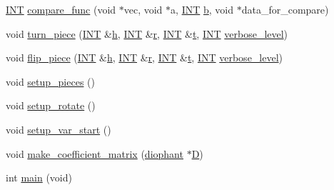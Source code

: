 \begin{DoxyCompactItemize}
\item 
\mbox{\hyperlink{galois_8h_a09fddde158a3a20bd2dcadb609de11dc}{I\+NT}} \mbox{\hyperlink{pentomino__5x5_8_c_af532ec92afffcb63cd1f1180e96642d4}{compare\+\_\+func}} (void $\ast$vec, void $\ast$a, \mbox{\hyperlink{galois_8h_a09fddde158a3a20bd2dcadb609de11dc}{I\+NT}} \mbox{\hyperlink{alphabet2_8_c_a148e3876077787926724625411d6e7a9}{b}}, void $\ast$data\+\_\+for\+\_\+compare)
\item 
void \mbox{\hyperlink{pentomino__5x5_8_c_afeaa9ad5370af3cec823a11a292bbf52}{turn\+\_\+piece}} (\mbox{\hyperlink{galois_8h_a09fddde158a3a20bd2dcadb609de11dc}{I\+NT}} \&\mbox{\hyperlink{alphabet2_8_c_a16611451551e3d15916bae723c3f59f7}{h}}, \mbox{\hyperlink{galois_8h_a09fddde158a3a20bd2dcadb609de11dc}{I\+NT}} \&\mbox{\hyperlink{alphabet2_8_c_acab531abaa74a7e664e3986f2522b33a}{r}}, \mbox{\hyperlink{galois_8h_a09fddde158a3a20bd2dcadb609de11dc}{I\+NT}} \&\mbox{\hyperlink{alphabet2_8_c_ac310d9181e916ba43604099aee272c71}{t}}, \mbox{\hyperlink{galois_8h_a09fddde158a3a20bd2dcadb609de11dc}{I\+NT}} \mbox{\hyperlink{simeon_8_c_a818073fbcc2f439e7c56952f67386122}{verbose\+\_\+level}})
\item 
void \mbox{\hyperlink{pentomino__5x5_8_c_aba47de4ac2eea1209cb16f98625291aa}{flip\+\_\+piece}} (\mbox{\hyperlink{galois_8h_a09fddde158a3a20bd2dcadb609de11dc}{I\+NT}} \&\mbox{\hyperlink{alphabet2_8_c_a16611451551e3d15916bae723c3f59f7}{h}}, \mbox{\hyperlink{galois_8h_a09fddde158a3a20bd2dcadb609de11dc}{I\+NT}} \&\mbox{\hyperlink{alphabet2_8_c_acab531abaa74a7e664e3986f2522b33a}{r}}, \mbox{\hyperlink{galois_8h_a09fddde158a3a20bd2dcadb609de11dc}{I\+NT}} \&\mbox{\hyperlink{alphabet2_8_c_ac310d9181e916ba43604099aee272c71}{t}}, \mbox{\hyperlink{galois_8h_a09fddde158a3a20bd2dcadb609de11dc}{I\+NT}} \mbox{\hyperlink{simeon_8_c_a818073fbcc2f439e7c56952f67386122}{verbose\+\_\+level}})
\item 
void \mbox{\hyperlink{pentomino__5x5_8_c_a4c7bd7404f2550f0a5aea0f72310d715}{setup\+\_\+pieces}} ()
\item 
void \mbox{\hyperlink{pentomino__5x5_8_c_a027a4b6309459ad5f250d29cab664b50}{setup\+\_\+rotate}} ()
\item 
void \mbox{\hyperlink{pentomino__5x5_8_c_a57d3d6e12b5850a46f75b5096b643c3c}{setup\+\_\+var\+\_\+start}} ()
\item 
void \mbox{\hyperlink{pentomino__5x5_8_c_a2852ec2c193452a04d8c7be0cbd73bd8}{make\+\_\+coefficient\+\_\+matrix}} (\mbox{\hyperlink{classdiophant}{diophant}} $\ast$\mbox{\hyperlink{costas_8_c_af13967e8da5ae214c112fd612639beaa}{D}})
\item 
int \mbox{\hyperlink{pentomino__5x5_8_c_a840291bc02cba5474a4cb46a9b9566fe}{main}} (void)
\end{DoxyCompactItemize}

